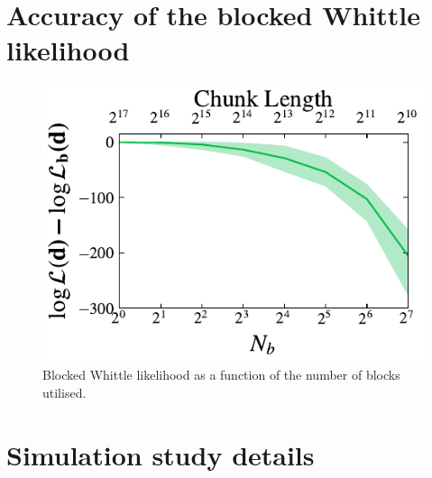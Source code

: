 \documentclass[%
 reprint,
 amsmath,amssymb,
 aps,
 nofootinbib,
]{revtex4-2}
\begin{document}
\appendix  


\section{Accuracy of the blocked  Whittle likelihood}
\label{appdx:blocked_lnl}
\begin{figure}[h]
  \includegraphics[width=\columnwidth]{lnl_vs_nchunks}
  \caption{Blocked Whittle likelihood as a function of the number of blocks utilised.}
  \label{lnl_vs_nchunks}
\end{figure}





\section{Simulation study details}
\end{document}
